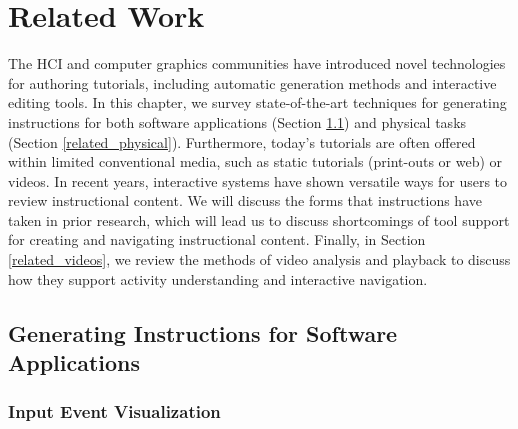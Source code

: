 
\chapter{Related Work}
\label{chapter_related_work}

The HCI and computer graphics communities have introduced novel technologies for authoring tutorials, including automatic generation methods and interactive editing tools.
%
In this chapter, we survey state-of-the-art techniques for generating instructions for both software applications (Section \ref{related_software}) and physical tasks (Section \ref{related_physical}).
%
Furthermore, today's tutorials are often offered within limited conventional media, such as static tutorials (print-outs or web) or videos. In recent years, interactive systems have shown versatile ways for users to review instructional content.
We will discuss the forms that instructions have taken in prior research, which will lead us to discuss shortcomings of tool support for creating and navigating instructional content.
%
Finally, in Section \ref{related_videos}, we review the methods of video analysis and playback to discuss how they support activity understanding and interactive navigation.


\section{Generating Instructions for Software Applications}
\label{related_software}

\subsection{Input Event Visualization}

